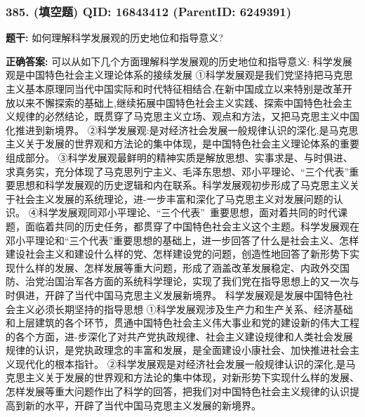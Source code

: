 \documentclass[12pt,UTF8]{ctexart}
\begin{document}
\vspace{0.3em}\hrulefill\vspace{0.7em}

\subsubsection*{385. (填空题) \small QID: 16843412 (ParentID: 6249391)}

\textbf{题干:}
如何理解科学发展观的历史地位和指导意义?



\textbf{正确答案:}
可以从如下几个方面理解科学发展观的历史地位和指导意义:
科学发展观是中国特色社会主义理论体系的接续发展
①科学发展观是我们党坚持把马克思主义基本原理同当代中国实际和时代特征相结合,在新中国成立以来特别是改革开放以来不懈探索的基础上,继续拓展中国特色社会主义实践、探索中国特色社会主义规律的必然结论，既贯穿了马克思主义立场、观点和方法，又把马克思主义中国化推进到新境界。
②科学发展观:是对经济社会发展一般规律认识的深化,是马克思主义关于发展的世界观和方法论的集中体现，是中国特色社会主义理论体系的重要组成部分。
③科学发展观最鲜明的精神实质是解放思想、实事求是、与时俱进、求真务实，充分体现了马克思列宁主义、毛泽东思想、邓小平理论、“三个代表”重要思想和科学发展观的历史逻辑和内在联系。科学发展观初步形成了马克思主义关于社会主义发展的系统理论，进-一步丰富和深化了马克思主义对发展问题的认识。
④科学发展观同邓小平理论、“三个代表” 重要思想，面对着共同的时代课题，面临着共同的历史任务，都贯穿了中国特色社会主义这个主题。科学发展观在邓小平理论和“三个代表”重要思想的基础上，进一步回答了什么是社会主义、怎样建设社会主义和建设什么样的党、怎样建设党的问题，创造性地回答了新形势下实现什么样的发展、怎样发展等重大问题，形成了涵盖改革发展稳定、内政外交国防、治党治国治军各方面的系统科学理论，实现了我们党在指导思想上的又一次与时俱进，开辟了当代中国马克思主义发展新境界。
科学发展观是发展中国特色社会主义必须长期坚持的指导思想
①科学发展观涉及生产力和生产关系、经济基础和上层建筑的各个环节，贯通中国特色社会主义伟大事业和党的建设新的伟大工程的各个方面，进-步深化了对共产党执政规律、社会主义建设规律和人类社会发展规律的认识，是党执政理念的丰富和发展，是全面建设小康社会、加快推进社会主义现代化的根本指针。
②科学发展观是对经济社会发展一般规律认识的深化,是马克思主义关于发展的世界观和方法论的集中体现，对新形势下实现什么样的发展、怎样发展等重大问题作出了科学的回答，把我们对中国特色社会主义规律的认识提高到新的水平，开辟了当代中国马克思主义发展的新境界。

\vspace{0.3em}\hrulefill\vspace{0.7em}
\end{document}
